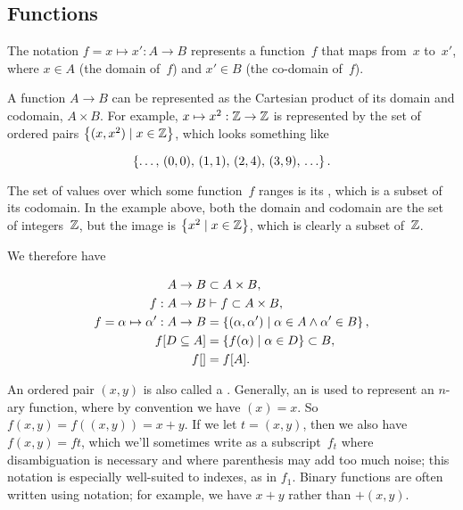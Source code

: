 \subsection{Functions}
\indexsym{}
\indexsym{}
The notation $f = x \mapsto x' : A\rightarrow B$ represents a function~$f$
  that maps from~$x$ to~$x'$,
    where $x\in A$ (the domain of~$f$) and $x'\in B$ (the co-domain of~$f$).

\indexsym{}
A function $A\rightarrow B$ can be represented as the Cartesian
  product of its domain and codomain, $A\times B$.
For example,
  $x\mapsto x^2 : \mathbb{Z}\rightarrow\mathbb{Z}$ is represented by the set of ordered
  pairs $\left\{(x,x^2) \mid x\in\mathbb{Z}\right\}$, which looks something like

\begin{equation*}
  \left\{\ldots,\,(0,0),\,(1,1),\,(2,4),\,(3,9),\,\ldots\right\}.
\end{equation*}

The set of values over which some function~$f$ ranges is its ,
  which is a subset of its codomain.
In the example above,
  both the domain and codomain are the set of integers~$\mathbb{Z}$,
  but the image is $\left\{x^2 \mid x\in\mathbb{Z}\right\}$,
    which is clearly a subset of~$\mathbb{Z}$.

We therefore have

\begin{align}
  A \rightarrow B &\subset A\times B, \\
  f : A \rightarrow B &\vdash f \subset A\times B, \\
  f = \alpha \mapsto \alpha' : A \rightarrow B
                  &= \left\{(\alpha,\alpha')
                            \mid \alpha\in A \land \alpha'\in B\right\}, \\
  f[D\subseteq A] &= \left\{f(\alpha) \mid \alpha\in D\right\} \subset B, \\
  f[] &= f[A].
\end{align}

An ordered pair $(x,y)$ is also called a .
Generally,
  an  is used to represent an $n$-ary function,
    where by convention we have $(x)=x$.
So $f(x,y) = f((x,y)) = x+y$.
If we let $t=(x,y)$,
  then we also have $f(x,y) = ft$,
    which we'll sometimes write as a subscript~$f_t$ where disambiguation is
      necessary and where parenthesis may add too much noise;
        this notation is especially well-suited to indexes,
          as in $f_1$.
Binary functions are often written using  notation;
  for example, we have $x+y$ rather than $+(x,y)$.

